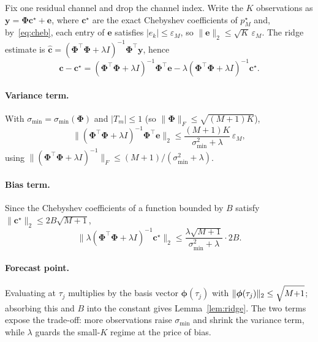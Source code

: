 \documentclass[10pt,twocolumn,letterpaper]{article}
\begin{document}
Fix one residual channel and drop the channel index. Write the $K$
observations as $\mathbf{y} = \mathbf{\Phi}\mathbf{c}^\star + \mathbf{e}$,
where $\mathbf{c}^\star$ are the exact Chebyshev coefficients of
$p_M^\star$ and, by~\eqref{eq:cheb}, each entry of $\mathbf{e}$ satisfies
$|e_k| \le \varepsilon_M$, so $\|\mathbf{e}\|_2 \le \sqrt{K}\,\varepsilon_M$.
The ridge estimate is
$\hat{\mathbf{c}} = (\mathbf{\Phi}^\top\mathbf{\Phi} + \lambda I)^{-1}
\mathbf{\Phi}^\top \mathbf{y}$, hence
\begin{equation}
  \hat{\mathbf{c}} - \mathbf{c}^\star
  = (\mathbf{\Phi}^\top\mathbf{\Phi} + \lambda I)^{-1}\mathbf{\Phi}^\top \mathbf{e}
  - \lambda(\mathbf{\Phi}^\top\mathbf{\Phi} + \lambda I)^{-1}\mathbf{c}^\star.
  \label{eq:app-split}
\end{equation}

\paragraph{Variance term.} With $\sigma_{\min} = \sigma_{\min}(\mathbf{\Phi})$
and $|T_m| \le 1$ (so $\|\mathbf{\Phi}\|_F \le \sqrt{(M{+}1)K}$),
\begin{equation}
  \|(\mathbf{\Phi}^\top\mathbf{\Phi} + \lambda I)^{-1}\mathbf{\Phi}^\top \mathbf{e}\|_2
  \le \frac{(M{+}1)K}{\sigma_{\min}^2 + \lambda}\,\varepsilon_M,
\end{equation}
using $\|(\mathbf{\Phi}^\top\mathbf{\Phi} + \lambda I)^{-1}\|_F \le
(M{+}1)/(\sigma_{\min}^2 + \lambda)$.

\paragraph{Bias term.} Since the Chebyshev coefficients of a function
bounded by $B$ satisfy $\|\mathbf{c}^\star\|_2 \le 2B\sqrt{M{+}1}$,
\begin{equation}
  \|\lambda(\mathbf{\Phi}^\top\mathbf{\Phi} + \lambda I)^{-1}\mathbf{c}^\star\|_2
  \le \frac{\lambda\sqrt{M{+}1}}{\sigma_{\min}^2 + \lambda}\cdot 2B.
\end{equation}

\paragraph{Forecast point.} Evaluating at $\tau_j$ multiplies by the basis
vector $\boldsymbol{\phi}(\tau_j)$ with
$\|\boldsymbol{\phi}(\tau_j)\|_2 \le \sqrt{M{+}1\strut}$; absorbing this and
$B$ into the constant gives Lemma~\ref{lem:ridge}. The two terms expose the
trade-off: more observations raise $\sigma_{\min}$ and shrink the variance
term, while $\lambda$ guards the small-$K$ regime at the price of bias.
\end{document}
